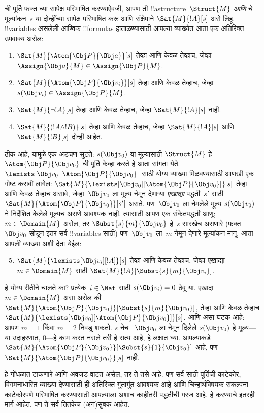 \documentclass[../../../include/open-logic-section]{subfiles}
\begin{document}
ची पूर्ति फक्त च्या सापेक्ष परिभाषित
करण्याऐवजी, आपण ती !!a{structure}~$\Struct{M}$ \emph{आणि}
चे मूल्यांकन~$s$ या दोन्हींच्या सापेक्ष परिभाषित करू आणि
संक्षेपाने $\Sat{M}{!A}[s]$ असे लिहू. !!{variable}s असलेली आण्विक
!!{formula}s हाताळण्यासाठी आपल्या व्याख्येत आता एक अतिरिक्त उपवाक्य
असेल:
\begin{enumerate}
  \item $\Sat{M}{\Atom{\Obj P}{\Obj a}}[s]$ तेव्हा आणि केवळ तेव्हाच,
  जेव्हा $\Assign{\Obj a}{M} \in \Assign{\Obj P}{M}$.
  \item $\Sat{M}{\Atom{\Obj P}{\Obj v_i}}[s]$ तेव्हा आणि केवळ तेव्हाच,
  जेव्हा $s(\Obj v_i) \in \Assign{\Obj P}{M}$.
  \item $\Sat{M}{\lnot !A}[s]$ तेव्हा आणि केवळ तेव्हाच, जेव्हा
  $\Sat{M}{!A}[s]$ नाही.
  \item $\Sat{M}{(!A \land !B)}[s]$ तेव्हा आणि केवळ तेव्हाच, जेव्हा
  $\Sat{M}{!A}[s]$ आणि $\Sat{M}{!B}[s]$ दोन्ही आहेत.
\end{enumerate}
ठीक आहे, यामुळे एक अडचण सुटते: $s(\Obj v_0)$ या मूल्यासाठी
$\Struct{M}$ हे $\Atom{\Obj P}{\Obj v_0}$ ची पूर्ति केव्हा करते हे आता
सांगता येते. $\lexists[\Obj v_0][\Atom{\Obj P}{\Obj v_0}]$ साठी योग्य
व्याख्या मिळवण्यासाठी आणखी एक गोष्ट करावी लागेल:
$\Sat{M}{\lexists[\Obj v_0][\Atom{\Obj P}{\Obj v_0}]}[s]$ तेव्हा आणि
केवळ तेव्हाच असावे, जेव्हा~$\Obj v_0$ ला मूल्य नेमून देणाऱ्या
\emph{एखाद्या} पद्धती~$s'$ साठी
$\Sat{M}{\Atom{\Obj P}{\Obj v_0}}[s']$ असते. पण~$\Obj v_0$ ला नेमलेले
मूल्य $s(\Obj v_0)$ ने निर्देशित केलेले मूल्यच असणे आवश्यक नाही.
त्यासाठी आपण एक संकेतपद्धती आणू: $m \in \Domain{M}$ असेल, तर
$\Subst{s}{m}{\Obj v_0}$ हे~$s$ सारखेच असणारे (फक्त~$\Obj v_0$ सोडून
इतर सर्व !!{variable}s साठी) पण~$\Obj v_0$ ला~$m$ नेमून देणारे
मूल्यांकन मानू. आता आपली व्याख्या अशी देता येईल:
\begin{enumerate}\setcounter{enumi}{4}
  \item $\Sat{M}{\lexists[\Obj v_i][!A]}[s]$ तेव्हा आणि केवळ तेव्हाच,
  जेव्हा एखाद्या~$m \in \Domain{M}$ साठी
  $\Sat{M}{!A}[\Subst{s}{m}{\Obj v_i}]$.
\end{enumerate}
हे योग्य रीतीने चालते का? प्रत्येक~$i \in \Nat$ साठी
$s(\Obj v_i) = 0$ ठेवू या. एखादा $m \in \Domain{M}$ असा असेल की
$\Sat{M}{\Atom{\Obj P}{\Obj v_0}}[\Subst{s}{m}{\Obj v_0}]$, तेव्हा आणि
केवळ तेव्हाच $\Sat{M}{\lexists[\Obj v_0][\Atom{\Obj P}{\Obj v_0}]}[s]$.
आणि असा घटक आहे: आपण $m = 1$ किंवा $m = 2$ निवडू शकतो. $s$ नेच
~$\Obj v_0$ ला नेमून दिलेले $s(\Obj v_0)$ हे मूल्य---या उदाहरणात,
$0$---हे काम करत नसले तरी हे सत्य आहे, हे लक्षात घ्या. आपल्याकडे
$\Sat{M}{\Atom{\Obj P}{\Obj v_0}}[\Subst{s}{1}{\Obj v_0}]$ आहे, पण
$\Sat{M}{\Atom{\Obj P}{\Obj v_0}}[s]$ नाही.

हे गोंधळात टाकणारे आणि अवजड वाटत असेल, तर ते तसे आहे. पण सर्व
साठी पूर्तिची काटेकोर, विगमनाधारित व्याख्या देण्यासाठी ही
अतिरिक्त गुंतागुंत आवश्यक आहे आणि चिन्हार्थविषयक संकल्पना काटेकोरपणे
परिभाषित करण्यासाठी आपल्याला अशाच काहीतरी पद्धतीची गरज आहे. हे
करण्याचे इतरही मार्ग आहेत, पण ते सर्व तितकेच (अन)सुबक आहेत.
\end{document}
